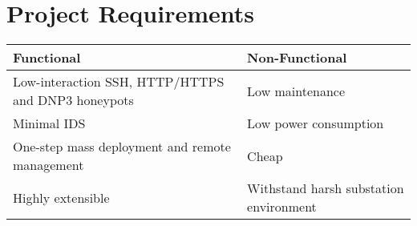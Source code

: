 \section*{\color{NavyBlue}Project Requirements}

\large

\begin{center}
\setlength{\tabcolsep}{24pt}
\renewcommand{\arraystretch}{1.4}
\begin{tabularx}{\linewidth}{X X}
\textbf{Functional} & \textbf{Non-Functional} \\
\midrule
Low-interaction SSH, HTTP/HTTPS and DNP3 honeypots & Low maintenance \\
Minimal IDS & Low power consumption \\
One-step mass deployment and remote management & Cheap \\
Highly extensible & Withstand harsh substation environment \\
\end{tabularx}
\end{center}
